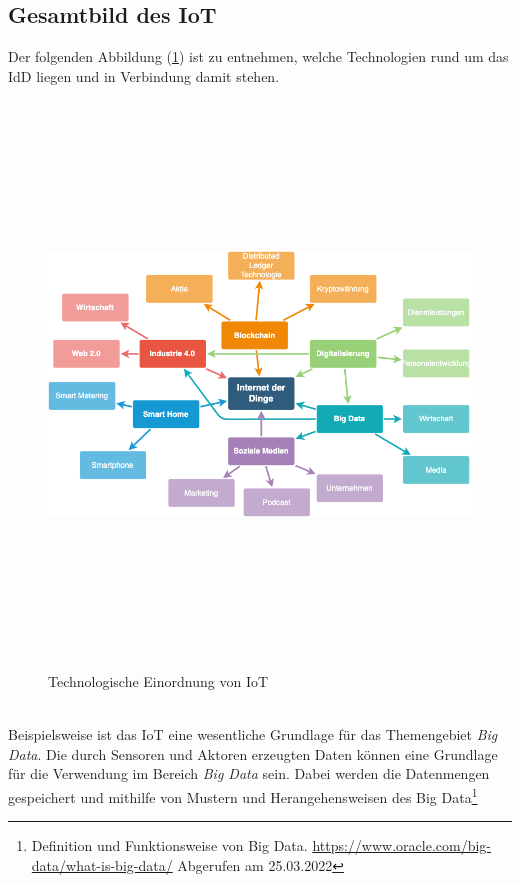     \subsection*{Gesamtbild des \acl{IoT}}
        Der folgenden Abbildung (\ref{pic:mindmap_IoT}) ist zu entnehmen, welche Technologien rund um das \acl{IdD} liegen und in Verbindung damit stehen. 
        \begin{figure}[hbt!]
            \centering
            \includegraphics[width=15cm,height=15cm,keepaspectratio]{images/IoT-Mind_Map.png}
            \caption{Technologische Einordnung von IoT \cite{iotmindmap2018}}
            \label{pic:mindmap_IoT}
        \end{figure}
        \\
        \pagebreak
        \linebreak
        Beispielsweise ist das \acs{IoT} eine wesentliche Grundlage für das Themengebiet \textit{Big Data}. Die durch Sensoren 
        und Aktoren erzeugten Daten 
        können eine Grundlage für die Verwendung im Bereich \textit{Big Data} sein. Dabei werden die Datenmengen gespeichert und mithilfe von Mustern 
        und Herangehensweisen des Big Data\footnote{Definition und Funktionsweise von Big Data. \url{https://www.oracle.com/big-data/what-is-big-data/} Abgerufen am 25.03.2022} 
